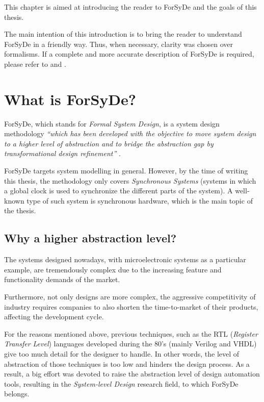 This chapter is aimed at introducing the reader to ForSyDe and the
goals of this thesis. 

The main intention of this introduction is to bring the reader to
understand ForSyDe in a friendly way. Thus, when necessary, clarity
was chosen over formalisms. If a complete and more accurate
description of ForSyDe is required, please refer to  \cite{forsyde} and
 \cite{forsyde:thesis}.


\section{What is ForSyDe?}

ForSyDe, which stands for \textit{Formal System Design}, is a system
design methodology \textit{``which has been developed with the
  objective to move system design to a higher level of abstraction and
  to bridge the abstraction gap by transformational design
  refinement''} \cite{forsyde:thesis}.

ForSyDe targets system modelling in general. However, by the time of
writing this thesis, the methodology only covers \textit{Synchronous
  Systems} (systems in which a global clock is used to synchronize the
different parts of the system). A well-known type of such system is
synchronous hardware, which is the main topic of the thesis.

\subsection{Why a higher abstraction level?}
The systems designed nowadays, with microelectronic systems as a
particular example, are tremendously complex due to the increasing
feature and functionality demands of the market.

Furthermore, not only designs are more complex, the aggressive
competitivity of industry requires companies to also shorten the
time-to-market of their products, affecting the development cycle.

For the reasons mentioned above, previous techniques, such as the RTL
(\textit{Register Transfer Level}) languages developed during the 80's
(mainly Verilog and VHDL) give too much detail for the designer to
handle. In other words, the level of abstraction of those techniques is
too low and hinders the design process.  As a result, a big effort was
devoted to raise the abstraction level of design automation tools,
resulting in the \textit{System-level Design} research field, to which
ForSyDe belongs.

